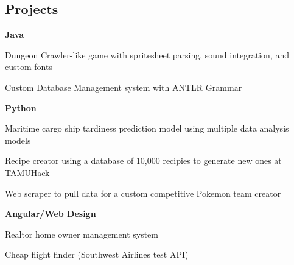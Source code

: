 \documentclass[10pt,letterpaper]{article}
\newenvironment{indentsection}[1]%
{\begin{list}{}%
	{\setlength{\leftmargin}{#1}}%
	\item[]%
}
{\end{list}}
\begin{document}
	\subsection*{Projects}
	\begin{indentsection}{\parindent}
		\begin{itemize*}
		\item \textbf{Java} 
		\vspace{-0.2em}
			\begin{itemize*}
				\item Dungeon Crawler-like game with spritesheet parsing, sound integration, and custom fonts 
				\item Custom Database Management system with ANTLR Grammar
			\end{itemize*}
		\item \textbf{Python}
		\vspace{-0.2em}
			\begin{itemize*}
				\item Maritime cargo ship tardiness prediction model using multiple data analysis models
				\item Recipe creator using a database of 10,000 recipies to generate new ones at TAMUHack 
				\item Web scraper to pull data for a custom competitive Pokemon team creator
		\end{itemize*}
		\item \textbf{Angular/Web Design}
		\vspace{-0.2em}
			\begin{itemize*}
				\item Realtor home owner management system
				\item Cheap flight finder (Southwest Airlines test API)
			\end{itemize*}
		\end{itemize*}
	\end{indentsection}
\end{document}
